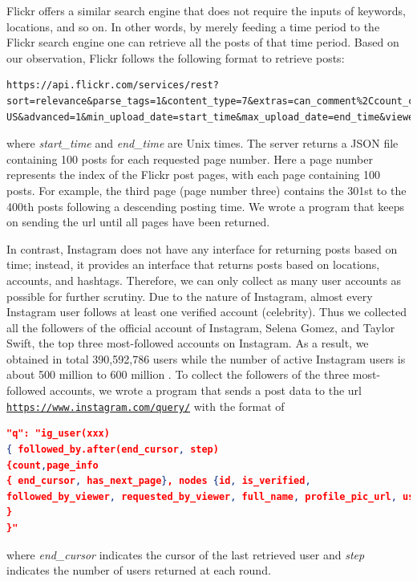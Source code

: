 \documentclass[letterpaper,12pt]{article}
\begin{document}
Flickr offers a similar search engine that does not require the inputs of keywords, locations, and so on. In other words, by merely feeding
a time period to the Flickr search engine one can retrieve all the posts
of that time period. Based on our observation, Flickr follows the following format to retrieve posts:
\begin{lstlisting}
https://api.flickr.com/services/rest?sort=relevance&parse_tags=1&content_type=7&extras=can_comment%2Ccount_comments%2Ccount_faves%2'Cdescription%2Cisfavorite%2Clicense%2Cmedia%2Cneeds_interstitial%2Cowner_name%2Cpath_alias%2Crealname%2Crotation%2Curl_c%2Curl_l%2Curl_m%2Curl_n%2Curl_q%2Curl_s%2Curl_sq%2Curl_t%2Curl_z&per_page=100&page=xx&lang=en-US&advanced=1&min_upload_date=start_time&max_upload_date=end_time&viewerNSID=xx&method=flickr.photos.search&'csrf=xx&api_key=xx6&format=json&hermes=1&'hermesClient=1&reqId=xx&nojsoncallback=1'
\end{lstlisting}
where \emph{start\_time} and \emph{end\_time} are Unix times. The
server returns a JSON file containing 100 posts for each requested
page number. Here a page number represents the index of the Flickr post pages, with each page containing 100 posts. For example, the third page (page number three) contains the 301st to the 400th posts following a descending posting time. We wrote a program that keeps on sending the url until all pages have been returned.

In contrast, Instagram does not have any interface for
returning posts based on time; instead, it provides an interface that
returns posts based on locations, accounts, and hashtags. Therefore, we
can only collect as many user accounts as possible for further scrutiny.
Due to the nature of Instagram, almost every
Instagram user follows at least one verified account (celebrity). Thus we
collected all the followers of the official account of Instagram, Selena Gomez, and Taylor Swift, the top three most-followed accounts on
Instagram. As a result, we obtained in total 390,592,786 users while the
number of active Instagram users is about 500 million to 600
million \cite{instdata}. To collect the followers of the three most-followed accounts, we wrote a program that sends a post data to the url \texttt{
\url{https://www.instagram.com/query/}} with the format of
\begin{lstlisting}[language=json,firstnumber=1, basicstyle=\scriptsize]
"q": "ig_user(xxx)
{ followed_by.after(end_cursor, step)
{count,page_info
{ end_cursor, has_next_page}, nodes {id, is_verified,
followed_by_viewer, requested_by_viewer, full_name, profile_pic_url, username}
}
}"
\end{lstlisting}
where \emph{end\_cursor} indicates the cursor of the last retrieved user and \emph{step} indicates the number of users returned at each round.
\end{document}
